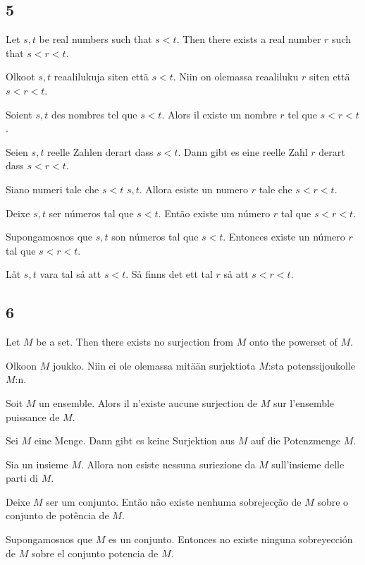 \documentclass{article}
\begin{document}
\subsection*{5}

Let $ s, t $ be real numbers such that $ s < t $. Then there exists a real number $ r $ such that $ s < r < t $.

Olkoot $ s, t $ reaalilukuja siten että $ s < t $. Niin on olemassa reaaliluku $ r $ siten että $ s < r < t $.

Soient $ s, t $ des nombres tel que $ s < t $. Alors il existe un nombre $ r $ tel que $ s < r < t $.

Seien $ s, t $ reelle Zahlen derart dass $ s < t $. Dann gibt es eine reelle Zahl $ r $ derart dass $ s < r < t $.

Siano numeri tale che $ s < t $ $ s, t $. Allora esiste un numero $ r $ tale che $ s < r < t $.

Deixe $ s, t $ ser números tal que $ s < t $. Então existe um número $ r $ tal que $ s < r < t $.

Supongamosnos que $ s, t $ son números tal que $ s < t $. Entonces existe un número $ r $ tal que $ s < r < t $.

Låt $ s, t $ vara tal så att $ s < t $. Så finns det ett tal $ r $ så att $ s < r < t $.

\subsection*{6}

Let $ M $ be a set. Then there exists no surjection from $ M $ onto the powerset of $ M $.

Olkoon $ M $ joukko. Niin ei ole olemassa mitään surjektiota $ M $:sta potenssijoukolle $ M $:n.

Soit $ M $ un ensemble. Alors il n'existe aucune surjection de $ M $ sur l'ensemble puissance de $ M $.

Sei $ M $ eine Menge. Dann gibt es keine Surjektion aus $ M $ auf die Potenzmenge $ M $.

Sia un insieme $ M $. Allora non esiste nessuna suriezione da $ M $ sull'insieme delle parti di $ M $.

Deixe $ M $ ser um conjunto. Então não existe nenhuma sobrejecção de $ M $ sobre o conjunto de potência de $ M $.

Supongamosnos que $ M $ es un conjunto. Entonces no existe ninguna sobreyección de $ M $ sobre el conjunto potencia de $ M $.
\end{document}
